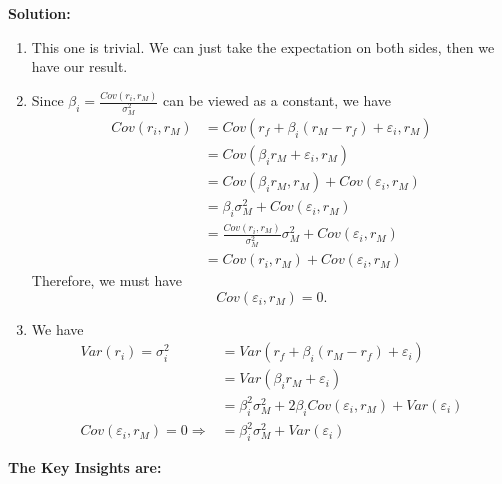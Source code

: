 \documentclass[13pt]{article}
\theoremstyle{definition}
\newenvironment{solution}
{\color{C2}\begin{framed}\begingroup\textbf{Solution:} }
  {\endgroup\end{framed}}
\theoremstyle{remark}
\begin{document}
\begin{solution}
    \begin{enumerate}[label=(\alph*)]
        \item This one is trivial. We can just take the expectation on both sides, then we have our result.
        \item Since $\beta_i=\frac{Cov\left(r_{i}, r_{M}\right)}{\sigma_{M}^{2}}$ can be viewed as a constant, we have
        \begin{align*}
            Cov\left(r_i, r_M\right)&=Cov\left(r_{f}+\beta_{i}\left(r_M-r_{f}\right)+\varepsilon_i, r_M\right)\\
            &=Cov\left(\beta_{i}r_M+\varepsilon_i, r_M\right)\\
            &=Cov\left(\beta_{i}r_M, r_M\right)+Cov\left(\varepsilon_i, r_M\right)\\
            &=\beta_{i}\sigma_M^2+Cov\left(\varepsilon_i, r_M\right)\\
            &=\frac{Cov\left(r_{i}, r_{M}\right)}{\sigma_{M}^{2}}\sigma_M^2+Cov\left(\varepsilon_i, r_M\right)\\
            &=Cov\left(r_i, r_M\right)+Cov\left(\varepsilon_i, r_M\right)
        \end{align*}
        Therefore, we must have
        \[
        Cov\left(\varepsilon_i, r_M\right)=0.
        \]
        \item We have
        \begin{align*}
            Var(r_i) = \sigma_i^2 &=Var(r_{f}+\beta_{i}\left(r_M-r_{f}\right)+\varepsilon_i)\\
            &=Var(\beta_{i}r_M+\varepsilon_i)\\
            &=\beta_{i}^{2} \sigma_{M}^{2}+2\beta_i Cov(\varepsilon_i, r_M)+Var\left(\varepsilon_i\right)\\
            Cov\left(\varepsilon_i, r_M\right)=0\Longrightarrow &=\beta_{i}^{2} \sigma_{M}^{2}+Var\left(\varepsilon_i\right)
        \end{align*}
    \end{enumerate}
\end{solution}

{\color{C6}\textbf{The Key Insights are:}}
\end{document}
